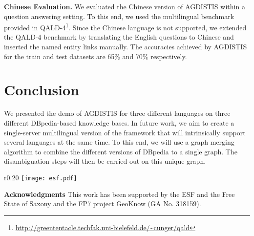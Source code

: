 \documentclass{llncs}
\begin{document}
\noindent \textbf{Chinese Evaluation.} We evaluated the Chinese version of AGDISTIS within a question answering setting. 
To this end, we used the multilingual benchmark provided in QALD-4\footnote{\url{http://greententacle.techfak.uni-bielefeld.de/~cunger/qald}}. 
Since the Chinese language is not supported, we extended the QALD-4 benchmark by translating the English questions to Chinese and inserted the named entity links manually.
The accuracies achieved by AGDISTIS for the train and test datasets are 65\% and 70\% respectively. 
\section{Conclusion}
We presented the demo of AGDISTIS for three different languages on three different DBpedia-based knowledge bases.
In future work, we aim to create a single-server multilingual version of the framework that will intrinsically support several languages at the same time.
To this end, we will use a graph merging algorithm to combine the different versions of DBpedia to a single graph.
The disambiguation steps will then be carried out on this unique graph.



\begin{wrapfigure}[2]{r}{0.20\textwidth}
 \vspace{-8mm}
 \texttt{[image: esf.pdf]}
\end{wrapfigure}
\textbf{Acknowledgments} This work has been supported by the ESF and the Free State of Saxony and the FP7 project GeoKnow (GA No. 318159).




\end{document}

